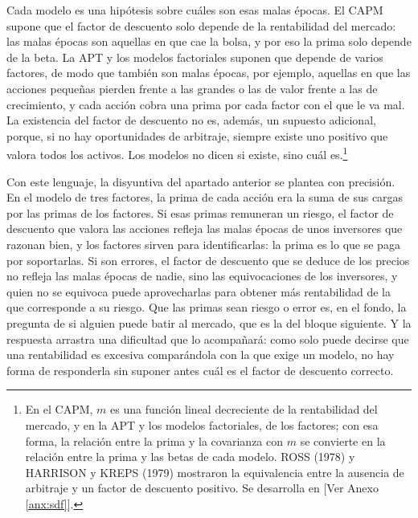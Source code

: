 \documentclass[10pt,a4paper]{article}
\newcommand{\authorfont}[1]{{\fontfamily{EBGaramond-TLF}\selectfont #1}}
\begin{document}
Cada modelo es una hipótesis sobre cuáles son esas malas épocas. El CAPM supone que el factor de descuento solo depende de la rentabilidad del mercado: las malas épocas son aquellas en que cae la bolsa, y por eso la prima solo depende de la beta. La APT y los modelos factoriales suponen que depende de varios factores, de modo que también son malas épocas, por ejemplo, aquellas en que las acciones pequeñas pierden frente a las grandes o las de valor frente a las de crecimiento, y cada acción cobra una prima por cada factor con el que le va mal. La existencia del factor de descuento no es, además, un supuesto adicional, porque, si no hay oportunidades de arbitraje, siempre existe uno positivo que valora todos los activos. Los modelos no dicen si existe, sino cuál es.\footnote{%
    En el CAPM, $m$ es una función lineal decreciente de la rentabilidad del mercado, y en la APT y los modelos factoriales, de los factores; con esa forma, la relación entre la prima y la covarianza con $m$ se convierte en la relación entre la prima y las betas de cada modelo. ROSS (1978) y HARRISON y KREPS (1979) mostraron la equivalencia entre la ausencia de arbitraje y un factor de descuento positivo. Se desarrolla en [\authorfont{Ver Anexo \ref{anx:sdf}}].
}

Con este lenguaje, la disyuntiva del apartado anterior se plantea con precisión. En el modelo de tres factores, la prima de cada acción era la suma de sus cargas por las primas de los factores. Si esas primas remuneran un riesgo, el factor de descuento que valora las acciones refleja las malas épocas de unos inversores que razonan bien, y los factores sirven para identificarlas: la prima es lo que se paga por soportarlas. Si son errores, el factor de descuento que se deduce de los precios no refleja las malas épocas de nadie, sino las equivocaciones de los inversores, y quien no se equivoca puede aprovecharlas para obtener más rentabilidad de la que corresponde a su riesgo. Que las primas sean riesgo o error es, en el fondo, la pregunta de si alguien puede batir al mercado, que es la del bloque siguiente. Y la respuesta arrastra una dificultad que lo acompañará: como solo puede decirse que una rentabilidad es excesiva comparándola con la que exige un modelo, no hay forma de responderla sin suponer antes cuál es el factor de descuento correcto.






\clearpage
\end{document}
